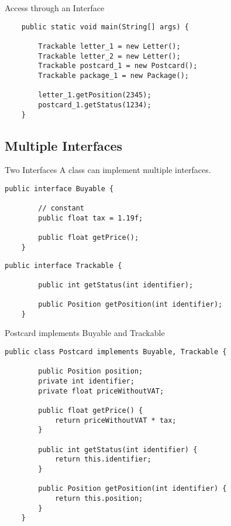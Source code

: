 \begin{frame}[fragile]{Access through an Interface}
    \begin{lstlisting}
    public static void main(String[] args) {
    
        Trackable letter_1 = new Letter();
        Trackable letter_2 = new Letter();
        Trackable postcard_1 = new Postcard();
        Trackable package_1 = new Package();
        
        letter_1.getPosition(2345);
        postcard_1.getStatus(1234);
    }
    \end{lstlisting}
\end{frame}

\subsection{Multiple Interfaces}
\begin{frame}[fragile]{Two Interfaces}
    A class can implement multiple interfaces.
    \vfill
    \begin{lstlisting}[basicstyle=\ttfamily\scriptsize]
    public interface Buyable {
    
        // constant
        public float tax = 1.19f;
    
        public float getPrice();
    }
    \end{lstlisting}
    \begin{lstlisting}[basicstyle=\ttfamily\scriptsize]
    public interface Trackable {
    
        public int getStatus(int identifier);
        
        public Position getPosition(int identifier);
    }
    \end{lstlisting}
\end{frame}

\begin{frame}[fragile]{Postcard implements Buyable and Trackable}
    \begin{lstlisting}[basicstyle=\ttfamily\scriptsize]
    public class Postcard implements Buyable, Trackable {
    
        public Position position;
        private int identifier;
        private float priceWithoutVAT;
        
        public float getPrice() {
            return priceWithoutVAT * tax;
        }
    
        public int getStatus(int identifier) {
            return this.identifier;
        }
        
        public Position getPosition(int identifier) {
            return this.position;
        }
    }
    \end{lstlisting}
\end{frame}

